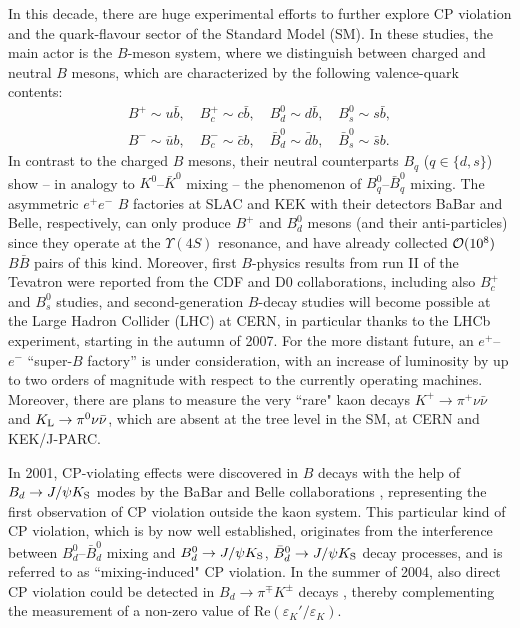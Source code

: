 \documentclass[12pt]{article}
\begin{document}
In this decade, there are huge experimental efforts to further 
explore CP violation and the quark-flavour sector of the Standard Model 
(SM). In these studies, the main actor is
the $B$-meson system, where we distinguish between charged and neutral 
$B$ mesons, which are characterized by the following valence-quark contents:
\begin{equation}\label{B-valence}
\begin{array}{c}
B^+\sim u \bar b, \quad B^+_c\sim c \bar b, \quad B^0_d\sim d \bar b, \quad
B^0_s\sim s \bar b, \\
B^-\sim \bar u b, \quad B^-_c\sim \bar c b, \quad \bar B^0_d\sim \bar d  b, \quad
\bar B^0_s\sim \bar s  b.
\end{array}
\end{equation}
In contrast to the charged $B$ mesons, their neutral counterparts
$B_q$ ($q\in \{d,s\}$) show
-- in analogy to $K^0$--$\bar K^0$ mixing -- the phenomenon of 
$B_q^0$--$\bar B_q^0$ mixing.
The asymmetric $e^+e^-$ $B$ factories at SLAC and KEK with their detectors 
BaBar and Belle, respectively, can only produce $B^+$ and $B^0_d$ mesons 
(and their anti-particles) since they operate at the $\Upsilon(4S)$ resonance, 
and have already collected ${\cal O}(10^8)$ $B\bar B$ pairs of this kind.
Moreover, first $B$-physics results from run II of the Tevatron were 
reported from the CDF and D0 collaborations, including also $B^+_c$
and $B^0_s$ studies, and second-generation $B$-decay
studies will become possible at the Large Hadron Collider (LHC)
at CERN, in particular thanks to the LHCb experiment, starting in the 
autumn of 2007. For the more distant future,
an $e^+$--$e^-$ ``super-$B$ factory'' is under consideration, with an
increase of luminosity by up to two orders of magnitude with respect to the 
currently operating machines. Moreover, there are plans to measure the 
very ``rare" kaon decays $K^+\to\pi^+\nu\bar\nu$ and $K_{\rm L}\to\pi^0\nu\bar\nu$, which are absent at the tree level in the SM, at CERN and KEK/J-PARC. 

In 2001, CP-violating effects were discovered in $B$ decays 
with the help of $B_d\to J/\psi K_{\rm S}$ modes by the BaBar and Belle 
collaborations \cite{CP-B-obs}, representing the first observation of CP violation 
outside the kaon system. This particular kind of CP violation, which is by
now well established, originates from the interference between 
$B^0_d$--$\bar B^0_d$ mixing and $B^0_d\to J/\psi K_{\rm S}$, 
$\bar B^0_d\to J/\psi K_{\rm S}$ decay processes, and is referred to as 
``mixing-induced" CP violation. In the summer of 2004, also direct CP 
violation could be detected in $B_d\to\pi^\mp K^\pm$ decays \cite{CP-B-dir}, 
thereby complementing the measurement of a non-zero
value of $\mbox{Re}(\varepsilon_K'/\varepsilon_K)$.
\end{document}
